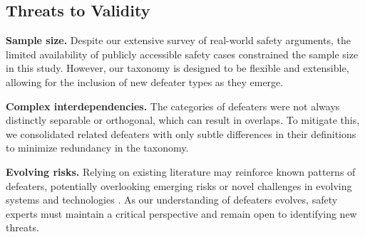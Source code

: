 \subsection{Threats to Validity}

\noindent \textbf{Sample size. } Despite our extensive survey of real-world safety arguments, the limited availability of publicly accessible safety cases constrained the sample size in this study. However, our taxonomy is designed to be flexible and extensible, allowing for the inclusion of new defeater types as they emerge. 

\noindent \textbf{Complex interdependencies. } The categories of defeaters were not always distinctly separable or orthogonal, which can result in overlaps. To mitigate this, we consolidated related defeaters with only subtle differences in their definitions to minimize redundancy in the taxonomy. 

\noindent \textbf{Evolving risks. }
Relying on existing literature may reinforce known patterns of defeaters, potentially overlooking emerging risks or novel challenges in evolving systems and technologies \cite{shelby2023sociotechnical}. As our understanding of defeaters evolves, safety experts must maintain a critical perspective and remain open to identifying new threats.
